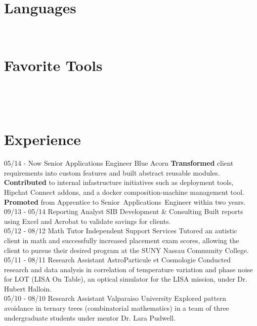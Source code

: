 \documentclass[]{friggeri-cv}
\begin{document}
\begin{aside}
  \section{Languages}
    ~
  \section{Favorite Tools}
    ~
\end{aside}
~
\section{Experience}
\begin{entrylist}
  \entry
    {05/14 - Now}
    {Senior Applications Engineer}
    {Blue Acorn}
    {\textbf{{\color{pblue}Transformed}} client requirements into custom features and built abstract reusable modules. \textbf{{\color{pblue}Contributed}} to internal infastructure initiatives such as deployment tools, Hipchat Connect addons, and a docker composition-machine management tool. \textbf{{\color{pblue}Promoted}} from Apprentice to \mbox{Senior Applications Engineer} within two years.}
  \entry
    {09/13 - 05/14}
    {Reporting Analyst}
    {SIB Development \& Consulting}
    {Built reports using Excel and Acrobat to validate savings for clients.\\}
    \entry
    {05/12 - 08/12}
    {Math Tutor}
    {Independent Support Services}
    {Tutored an autistic client in math and successfully increased placement exam scores, allowing the client to pursue their desired program at the SUNY Nassau Community College.\\}
    \entry
    {05/11 - 08/11}
    {Research Assistant}
    {AstroParticule et Cosmologie}
    {Conducted research and data analysis in correlation of temperature variation and phase noise for LOT (LISA On Table), an optical simulator for the LISA mission, under Dr. Hubert Halloin.\\}
    \entry
    {05/10 - 08/10}
    {Research Assistant}
    {Valparaiso University}
    {Explored pattern avoidance in ternary trees (combinatorial mathematics) in a team of three undergraduate students under mentor Dr. Lara Pudwell.\\}
\end{entrylist}
\end{document}
